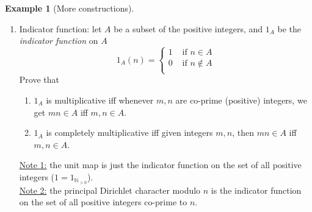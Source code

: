 \documentclass{article}
\theoremstyle{definition}
\newtheorem{example}[theorem]{Example}
\begin{document}
\begin{example}[More constructions]
\begin{enumerate}
	\\
	Show that the function $f(n) = e^{w(n)}$ is a multiplicative function if $w$ is additive. $f$ is completely multiplicative if $w$ is completely additive.
	\\
	\\
	For example, the Liouville function $\lambda(n) = (-1)^{\Omega(n)}$ is completely multiplicative, where $\Omega(n)$ counts the number of primes (with multiplicity) of $n$.
	\item Indicator function: let $A$ be a subset of the positive integers, and $1_A$ be the \emph{indicator function} on $A$
	$$1_A (n) = \begin{cases}
	1 & \mbox{ if } n \in A \\
	0 & \mbox{ if } n \notin A \\
	\end{cases}$$
	Prove that
	\begin{enumerate}
		\item $1_A$ is multiplicative iff whenever $m, n$ are co-prime (positive) integers, we get $mn \in A$ iff $m, n \in A$.
		\item $1_A$ is completely multiplicative iff given integers $m, n$, then $mn \in A$ iff $m, n \in A$.
	\end{enumerate}
	\underline{Note 1:} the unit map is just the indicator function on the set of all positive integers ($1 = 1_{\mathbb{N}_{>0}}$).
	\\
	\underline{Note 2:} the principal Dirichlet character modulo $n$ is the indicator function on the set of all positive integers co-prime to $n$.
\end{enumerate}
\end{example}
\end{document}
